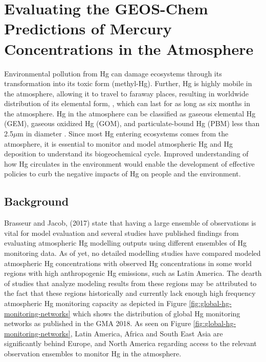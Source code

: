 \chapter{Evaluating the GEOS-Chem Predictions of Mercury Concentrations in the Atmosphere }
\begin{flushleft}
Environmental pollution from Hg can damage ecosystems through its transformation into its toxic form (methyl-Hg). Further, Hg is highly mobile in the atmosphere, allowing it to travel to faraway places, resulting in worldwide distribution of its elemental form, \hg, which can last for as long as six months in the atmosphere\cite{horowitz_new_2017,shah_improved_2021}. Hg in the atmosphere can be classified as gaseous elemental Hg (GEM), gaseous oxidized Hg (GOM), and particulate-bound Hg (PBM) less than 2.5$\mu$m in diameter \cite{lindberg_synthesis_2007,schroeder_atmospheric_1998,landis_development_2002}. Since most Hg entering ecosystems comes from the atmosphere, it is essential to monitor and model atmospheric Hg and Hg deposition to understand its biogeochemical cycle. Improved understanding of how Hg circulates in the environment would enable the development of effective policies to curb the negative impacts of Hg on people and the environment.
\end{flushleft}
\section{Background}
\begin{flushleft}

Brasseur and Jacob, (2017) state that having a large ensemble of observations is vital for model evaluation and several studies have published findings from evaluating atmospheric Hg modelling outputs using different ensembles of Hg monitoring data\cite{brasseur_modeling_2017}. As of yet, no detailed modelling studies have compared modeled atmospheric Hg concentrations with observed Hg concentrations in some world regions with high anthropogenic Hg emissions, such as Latin America. The dearth of studies that analyze modeling results from these regions may be attributed to the fact that these regions historically and currently lack enough high frequency atmospheric Hg monitoring capacity as depicted in Figure \ref{fig:global-hg-monitoring-networks} which shows the distribution of global Hg monitoring networks as published in the GMA 2018. As seen on Figure \ref{fig:global-hg-monitoring-networks}, Latin America, Africa and South East Asia are significantly behind Europe, and North America regarding access to the relevant observation ensembles to monitor Hg in the atmosphere. 
\end{flushleft}

